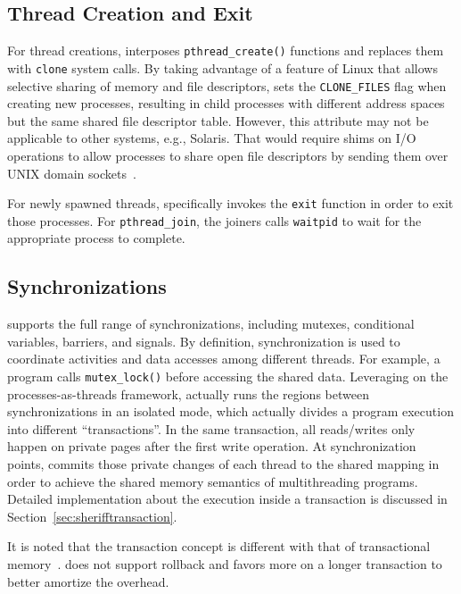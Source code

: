 \subsection{Thread Creation and Exit}

For thread creations, \sheriff{} interposes \texttt{pthread\_create()} functions and replaces them with \texttt{clone} system calls. 
By taking advantage of a feature of Linux that allows
selective sharing of memory and file descriptors, \sheriff{}
sets the \texttt{CLONE\_FILES} flag when creating new processes, resulting in child processes with different address spaces but the same shared file descriptor table. However, this attribute may not be applicable to other systems, e.g., Solaris. That would require shims on I/O operations to allow processes to share open file descriptors by sending
them over UNIX domain sockets~\cite[Section 17.4]{unixprogramming}.

For newly spawned threads, \sheriff{} specifically invokes the \texttt{exit} function in order to exit those processes. For \texttt{pthread\_join}, the joiners  calls \texttt{waitpid} to wait for the appropriate process to complete.  

\subsection{Synchronizations}
\label{sec:sheriffsync}

\sheriff{} supports the full range of synchronizations, including mutexes, conditional variables, barriers, and signals. By definition, synchronization is used to coordinate activities and data accesses among different threads. For example, a program calls \texttt{mutex\_lock()} before accessing the shared data. Leveraging on the processes-as-threads framework, \sheriff{} actually runs the regions between synchronizations in an isolated mode, which actually divides a program execution into different ``transactions''. In the same transaction, all reads/writes only happen on private pages after the first write operation.  At synchronization points, \sheriff{} commits those private changes of each thread to the shared mapping in order to achieve the shared memory semantics of multithreading programs. Detailed implementation about the execution inside a transaction is discussed in Section~\ref{sec:sherifftransaction}. 

It is noted that the transaction concept is different with that of transactional memory~\cite{transaction}. \sheriff{} does not support rollback and favors more on a longer transaction to better amortize the overhead. 

